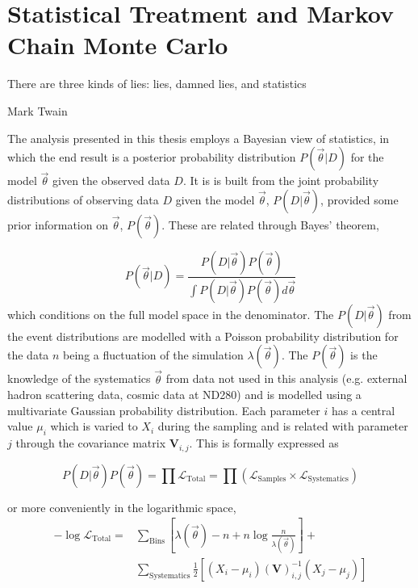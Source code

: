\chapter{Statistical Treatment and Markov Chain Monte Carlo}
\label{chap:mcmc}

\epigraph{There are three kinds of lies: lies, damned lies, and statistics}{Mark Twain}

The analysis presented in this thesis employs a Bayesian view of statistics, in which the end result is a posterior probability distribution $P(\vec{\theta}|D)$ for the model $\vec{\theta}$ given the observed data $D$. It is is built from the joint probability distributions of observing data $D$ given the model $\vec{\theta}$, $P(D|\vec{\theta})$, provided some prior information on $\vec{\theta}$, $P(\vec{\theta})$. These are related through Bayes' theorem,

\begin{equation}
P(\vec{\theta}|D) = \frac{P(D|\vec{\theta})P(\vec{\theta})}{\int P(D|\vec{\theta})P(\vec{\theta})d\vec{\theta}}
\label{eq:bayes}
\end{equation}
which conditions on the full model space in the denominator. The $P(D|\vec{\theta})$ from the event distributions are modelled with a Poisson probability distribution for the data $n$ being a fluctuation of the simulation $\lambda(\vec{\theta})$. The $P(\vec{\theta})$ is the knowledge of the systematics $\vec{\theta}$ from data not used in this analysis (e.g. external hadron scattering data, cosmic data at ND280) and is modelled using a multivariate Gaussian probability distribution. Each parameter $i$ has a central value $\mu_i$ which is varied to $X_i$ during the sampling and is related with parameter $j$ through the covariance matrix $\mathbf{V}_{i,j}$. This is formally expressed as

\begin{equation}
	P(D|\vec{\theta}) P(\vec{\theta}) = \prod \mathcal{L}_\text{Total} = \prod \left(\mathcal{L}_\text{Samples} \times \mathcal{L}_\text{Systematics}\right)
\end{equation}

or more conveniently in the logarithmic space,
\begin{equation}
\label{eq:test_stat}
\begin{split}
	- \log\mathcal{L}_\text{Total} = &\sum_\text{Bins} \left[ \lambda(\vec{\theta}) - n + n \log \frac{n}{\lambda(\vec{\theta})} \right] + \\
									& \sum_\text{Systematics} \frac{1}{2} \left[ ( X_i - \mu_i ) \left( \boldsymbol{V} \right)^{-1}_{i,j} ( X_j - \mu_j ) \right]
\end{split}
\end{equation}

